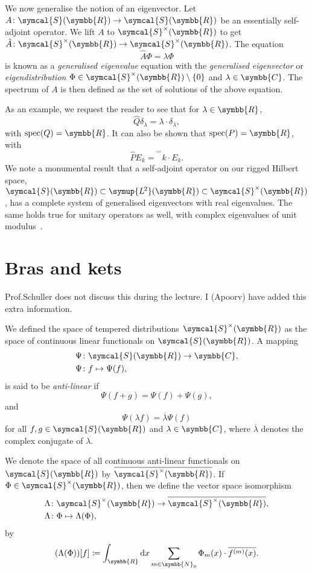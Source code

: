 \documentclass[12pt, a4 paper]{article}
\theoremstyle{definition}
\newcommand{\ltwo}{\symup{L\kern-0.5pt^2}}
\newcommand{\position}{Q}
\newcommand{\momentum}{P}
\newcommand{\rr}{\symbb{R}}
\newcommand{\cc}{\symbb{C}}
\newcommand{\nn}{\symbb{N}_0}
\newcommand{\dirac}{\delta}
\newcommand{\ltwor}{\ltwo(\rr)}
\newcommand{\schwartz}{\symcal{S}}
\newcommand{\schwartzr}{\schwartz(\rr)}
\newcommand{\dist}{\schwartz^\times}
\newcommand{\distr}{\dist(\rr)}
\newcommand{\anti}{\overline{\distr}}
\renewcommand*{\hbar}{\mathrm{^^^^0127}}
\DeclareMathOperator{\spec}{spec}
\newcommand{\der}{\operatorname{d\!}{}}
\begin{document}
    We now generalise the notion of an eigenvector. Let $A \colon \schwartzr \rightarrow \schwartzr$ be an essentially self-adjoint operator. We lift $A$ to $\distr$ to get $\hat{A} \colon \distr \rightarrow \distr$. The equation
    \[
    \hat{A} \Phi = \lambda \Phi
    \]
    is known as a \textit{generalised eigenvalue} equation with the \textit{generalised eigenvector} or \textit{eigendistribution} $\Phi \in \distr \setminus \{0\}$ and $\lambda \in \cc$.
    The spectrum of $A$ is then defined as the set of solutions of the above equation.

    As an example, we request the reader to see that for $\lambda \in \rr$,
    \[
    \hat{\position}\dirac_\lambda = \lambda \cdot \dirac_\lambda,
    \]
    with $\spec(\position) = \rr$.
    It can also be shown that $\spec(\momentum) = \rr$, with
    \[
    \hat{\momentum}E_k = \hbar k \cdot E_k.
    \]
    We note a monumental result that a self-adjoint operator on our rigged Hilbert space, $\schwartzr \subset \ltwor \subset \distr$, has a complete system of generalised eigenvectors with real eigenvalues. The same holds true for unitary operators as well, with complex eigenvalues of unit modulus~\cite{gelfand, spectralthm, gould, Blanchard}.

    \section{Bras and kets}

    Prof.\@ Schuller does not discuss this during the lecture. I (Apoorv) have added this extra information.

    We defined the space of tempered distributions $\distr$ as the space of continuous linear functionals on $\schwartzr$. A mapping
    \begin{align*}
        \Psi &\colon \schwartzr \rightarrow \cc,\\
        \Psi &\colon f \mapsto \Psi(f),
    \end{align*}
    is said to be \textit{anti-linear} if
    \[
    \Psi(f + g) = \Psi(f) + \Psi(g),
    \]
    and
    \[
    \Psi(\lambda f) = \overline{\lambda}\Psi(f)
    \]
    for all $f, g \in \schwartzr$ and $\lambda \in \cc$, where $\overline{\lambda}$ denotes the complex conjugate of $\lambda$.

    We denote the space of all continuous anti-linear functionals on $\schwartzr$ by $\anti$. If $\Phi \in \distr$, then we define the vector space isomorphism
    \begin{align*}
        \Lambda &\colon \distr \rightarrow \anti,\\
        \Lambda &\colon \Phi \mapsto \Lambda(\Phi),
    \end{align*}
    by
    \begin{align*}
        (\Lambda(\Phi))[f] \coloneq \int_{\rr} \der x \sum_{m \in \nn} \Phi_m (x) \cdot \overline{f^{(m)} (x)}.
    \end{align*}
\end{document}
